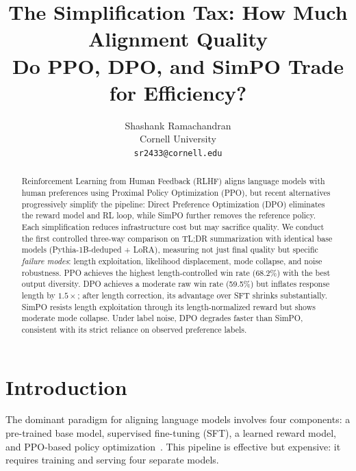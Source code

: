 \documentclass[10pt,twocolumn,letterpaper]{article}
\begin{document}
\title{The Simplification Tax: How Much Alignment Quality\\Do PPO, DPO, and SimPO Trade for Efficiency?}

\author{Shashank Ramachandran\\
Cornell University\\
{\tt\small sr2433@cornell.edu}}

\maketitle

\begin{abstract}
Reinforcement Learning from Human Feedback (RLHF) aligns language models with human preferences using Proximal Policy Optimization (PPO), but recent alternatives progressively simplify the pipeline: Direct Preference Optimization (DPO) eliminates the reward model and RL loop, while SimPO further removes the reference policy. Each simplification reduces infrastructure cost but may sacrifice quality. We conduct the first controlled three-way comparison on TL;DR summarization with identical base models (Pythia-1B-deduped + LoRA), measuring not just final quality but specific \emph{failure modes}: length exploitation, likelihood displacement, mode collapse, and noise robustness. PPO achieves the highest length-controlled win rate (68.2\%) with the best output diversity. DPO achieves a moderate raw win rate (59.5\%) but inflates response length by $1.5\times$; after length correction, its advantage over SFT shrinks substantially. SimPO resists length exploitation through its length-normalized reward but shows moderate mode collapse. Under label noise, DPO degrades faster than SimPO, consistent with its strict reliance on observed preference labels.
\end{abstract}

\section{Introduction}

The dominant paradigm for aligning language models involves four components: a pre-trained base model, supervised fine-tuning (SFT), a learned reward model, and PPO-based policy optimization~\cite{ouyang2022training, stiennon2020learning}. This pipeline is effective but expensive: it requires training and serving four separate models.
\end{document}
